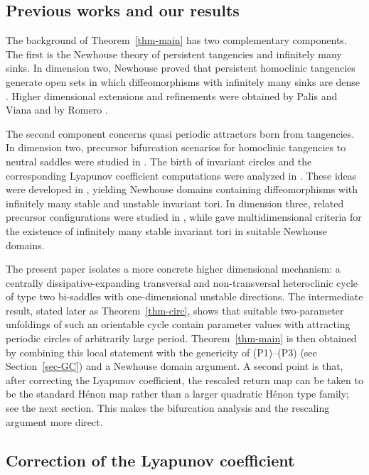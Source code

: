 \documentclass[11pt,a4paper]{article}
\theoremstyle{plain}
\theoremstyle{definition}
\theoremstyle{plain}
\numberwithin{equation}{section}
\begin{document}
\subsection{Previous works and our results}

The background of Theorem~\ref{thm-main} has two complementary components. The first is the Newhouse theory of persistent tangencies and infinitely many sinks. In dimension two, Newhouse proved that persistent homoclinic tangencies generate open sets in which diffeomorphisms with infinitely many sinks are dense \cite{Newhouse1974}. Higher dimensional extensions and refinements were obtained by Palis and Viana \cite{PalisViana1994} and by Romero \cite{Romero1995}.

The second component concerns quasi periodic attractors born from tangencies. In dimension two, precursor bifurcation scenarios for homoclinic tangencies to neutral saddles were studied in \cite{G2002}. The birth of invariant circles and the corresponding Lyapunov coefficient computations were analyzed in \cite{GG2000,GG2004}. These ideas were developed in \cite{GSS2002,GSS2006}, yielding Newhouse domains containing diffeomorphisms with infinitely many stable and unstable invariant tori. In dimension three, related precursor configurations were studied in \cite{GO2005,Tatjer2001}, while \cite[Theorem~6]{GST2008} gave multidimensional criteria for the existence of infinitely many stable invariant tori in suitable Newhouse domains.

The present paper isolates a more concrete higher dimensional mechanism: a centrally dissipative-expanding transversal and non-transversal heteroclinic cycle of type two bi-saddles with one-dimensional unstable directions. The intermediate result, stated later as Theorem~\ref{thm-circ}, shows that suitable two-parameter unfoldings of such an orientable cycle contain parameter values with attracting periodic circles of arbitrarily large period. Theorem~\ref{thm-main} is then obtained by combining this local statement with the genericity of \textup{(P1)}--\textup{(P3)} (see Section~\ref{sec-GC}) and a Newhouse domain argument. A second point is that, after correcting the Lyapunov coefficient, the rescaled return map can be taken to be the standard H\'enon map rather than a larger quadratic H\'enon type family; see the next section. This makes the bifurcation analysis and the rescaling argument more direct.

\subsection{Correction of the Lyapunov coefficient}
\label{sec-RLC}
\end{document}
